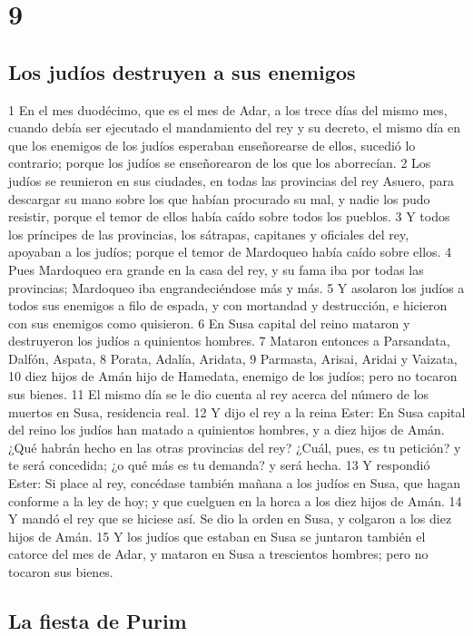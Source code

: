 \chapter{9}

\section*{Los judíos destruyen a sus enemigos}


1 En el mes duodécimo, que es el mes de Adar, a los trece días del mismo mes, cuando debía ser ejecutado el mandamiento del rey y su decreto, el mismo día en que los enemigos de los judíos esperaban enseñorearse de ellos, sucedió lo contrario; porque los judíos se enseñorearon de los que los aborrecían.
2 Los judíos se reunieron en sus ciudades, en todas las provincias del rey Asuero, para descargar su mano sobre los que habían procurado su mal, y nadie los pudo resistir, porque el temor de ellos había caído sobre todos los pueblos.
3 Y todos los príncipes de las provincias, los sátrapas, capitanes y oficiales del rey, apoyaban a los judíos; porque el temor de Mardoqueo había caído sobre ellos.
4 Pues Mardoqueo era grande en la casa del rey, y su fama iba por todas las provincias; Mardoqueo iba engrandeciéndose más y más.
5 Y asolaron los judíos a todos sus enemigos a filo de espada, y con mortandad y destrucción, e hicieron con sus enemigos como quisieron.
6 En Susa capital del reino mataron y destruyeron los judíos a quinientos hombres.
7 Mataron entonces a Parsandata, Dalfón, Aspata,
8 Porata, Adalía, Aridata,
9 Parmasta, Arisai, Aridai y Vaizata,
10 diez hijos de Amán hijo de Hamedata, enemigo de los judíos; pero no tocaron sus bienes.
11 El mismo día se le dio cuenta al rey acerca del número de los muertos en Susa, residencia real.
12 Y dijo el rey a la reina Ester: En Susa capital del reino los judíos han matado a quinientos hombres, y a diez hijos de Amán. ¿Qué habrán hecho en las otras provincias del rey? ¿Cuál, pues, es tu petición? y te será concedida; ¿o qué más es tu demanda? y será hecha.
13 Y respondió Ester: Si place al rey, concédase también mañana a los judíos en Susa, que hagan conforme a la ley de hoy; y que cuelguen en la horca a los diez hijos de Amán.
14 Y mandó el rey que se hiciese así. Se dio la orden en Susa, y colgaron a los diez hijos de Amán.
15 Y los judíos que estaban en Susa se juntaron también el catorce del mes de Adar, y mataron en Susa a trescientos hombres; pero no tocaron sus bienes.
\section*{La fiesta de Purim}

